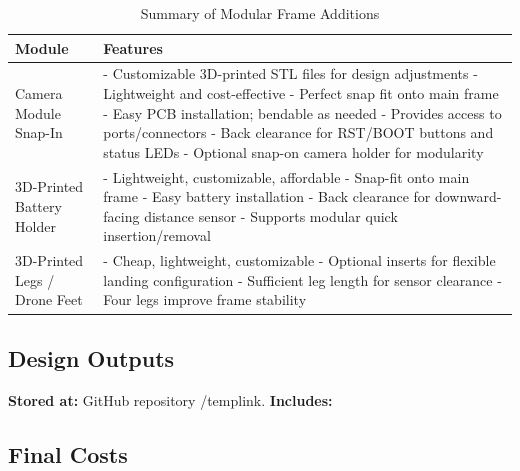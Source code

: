 \begin{table}[H]
\centering
\begin{tabular}{|p{3cm}|p{11cm}|}
\hline
\rowcolor{gray!15}
\textbf{Module} & \textbf{Features} \\
\hline
Camera Module Snap-In & 
- Customizable 3D-printed STL files for design adjustments \newline
- Lightweight and cost-effective \newline
- Perfect snap fit onto main frame \newline
- Easy PCB installation; bendable as needed \newline
- Provides access to ports/connectors \newline
- Back clearance for RST/BOOT buttons and status LEDs \newline
- Optional snap-on camera holder for modularity \\
\hline
3D-Printed Battery Holder & 
- Lightweight, customizable, affordable \newline
- Snap-fit onto main frame \newline
- Easy battery installation \newline
- Back clearance for downward-facing distance sensor \newline
- Supports modular quick insertion/removal \\
\hline
3D-Printed Legs / Drone Feet & 
- Cheap, lightweight, customizable \newline
- Optional inserts for flexible landing configuration \newline
- Sufficient leg length for sensor clearance \newline
- Four legs improve frame stability \\
\hline
\end{tabular}
\caption{Summary of Modular Frame Additions}
\label{tab:frame-add-summary}
\end{table}

\subsection{Design Outputs}
\textbf{Stored at:} GitHub repository /temp{link}.  
\textbf{Includes:} 

\subsection{Final Costs}
